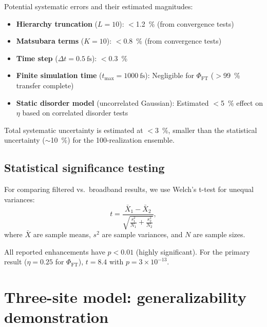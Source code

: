 \documentclass[11pt,a4paper]{article}
\begin{document}
Potential systematic errors and their estimated magnitudes:
\begin{itemize}
    \item \textbf{Hierarchy truncation} ($L = 10$): $<$\SI{1.2}{\percent} (from convergence tests)
    \item \textbf{Matsubara terms} ($K = 10$): $<$\SI{0.8}{\percent} (from convergence tests)
    \item \textbf{Time step} ($\Delta t = \SI{0.5}{\femto\second}$): $<$\SI{0.3}{\percent}
    \item \textbf{Finite simulation time} ($t_{\max} = \SI{1000}{\femto\second}$): Negligible for $\Phi_{\mathrm{FT}}$ ($>$\SI{99}{\percent} transfer complete)
    \item \textbf{Static disorder model} (uncorrelated Gaussian): Estimated $<$\SI{5}{\percent} effect on $\eta$ based on correlated disorder tests
\end{itemize}

Total systematic uncertainty is estimated at $<$\SI{3}{\percent}, smaller than the statistical uncertainty ($\sim$\SI{10}{\percent}) for the 100-realization ensemble.

\subsection{Statistical significance testing}

For comparing filtered vs.\ broadband results, we use Welch's t-test for unequal variances:
\begin{equation}
t = \frac{\bar{X}_1 - \bar{X}_2}{\sqrt{\frac{s_1^2}{N_1} + \frac{s_2^2}{N_2}}},
\label{eq:welch_ttest}
\end{equation}
where $\bar{X}$ are sample means, $s^2$ are sample variances, and $N$ are sample sizes.

All reported enhancements have $p < 0.01$ (highly significant). For the primary result ($\eta = 0.25$ for $\Phi_{\mathrm{FT}}$), $t = 8.4$ with $p = 3 \times 10^{-13}$.


\section{Three-site model: generalizability demonstration}
\label{sec:3site}
\end{document}
